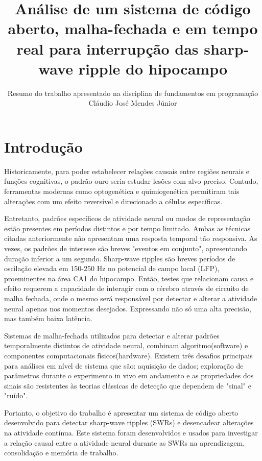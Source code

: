 \documentclass{IEEEtran}
\begin{document}
\title{Análise de um sistema de código aberto, malha-fechada e em tempo real para interrupção das sharp-wave ripple do hipocampo}
\author{Resumo do trabalho apresentado na disciplina de fundamentos em programação

Cláudio José Mendes Júnior}

\maketitle

\section{Introdução}
\label{sec:introduction}
Historicamente, para poder estabelecer relações causais entre regiões neurais e funções cognitivas, o padrão-ouro seria estudar lesões com alvo preciso. Contudo, ferramentas modernas como optogenética e quimiogenética permitiram tais alterações com um efeito reversível e direcionado a células específicas.

Entretanto, padrões específicos de atividade neural ou modos de representação estão presentes em períodos distintos e por tempo limitado. Ambas as técnicas citadas anteriormente não apresentam uma resposta temporal tão responsiva. As vezes, os padrões de interesse são breves "eventos em conjunto", apresentando duração inferior a um segundo. Sharp-wave ripples são breves períodos de oscilação elevada em 150-250 Hz no potencial de campo local (LFP), proeminentes na área CA1 do hipocampo.  Então, testes que relacionam causa e efeito requerem a capacidade de interagir com o cérebro através de circuito de malha fechada, onde o mesmo será responsável por detectar e alterar a atividade neural apenas nos momentos desejados. Expressando não só uma alta precisão, mas também baixa latência.

Sistemas de malha-fechada utilizados para detectar e alterar padrões temporalmente distintos de atividade neural, combinam algoritmo(software) e componentes computacionais físicos(hardware). Existem três desafios principais para análises em nível de sistema que são: aquisição de dados; exploração de parâmetros durante o experimento in vivo em andamento e as propriedades dos sinais são resistentes às teorias clássicas de detecção que dependem de "sinal" e "ruído".

Portanto, o objetivo do trabalho é apresentar um sistema de código aberto desenvolvido para detectar sharp-wave ripples (SWRs) e desencadear alterações na atividade contínua. Este sistema foram desenvolvidos e usados para investigar a relação causal entre a atividade neural durante as SWRs na aprendizagem, consolidação e memória de trabalho.
\end{document}

